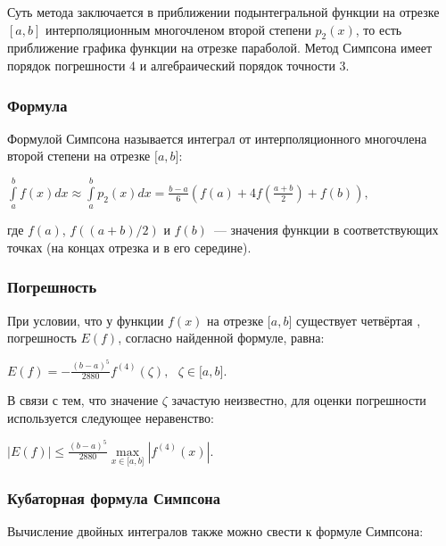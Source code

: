 \documentclass[a4paper]{article}
\begin{document}
{{{{{{{{Суть метода заключается в приближении подынтегральной функции на отрезке $[a,b]$ интерполяционным многочленом второй степени $p_2(x)$, то есть приближение графика функции на отрезке параболой. Метод Симпсона имеет порядок погрешности 4 и алгебраический порядок точности 3.

\subsubsection{Формула}

Формулой Симпсона называется интеграл от интерполяционного многочлена
второй степени на отрезке {{\(\lbrack a,b\rbrack\)}}:

\begin{center}
 {{\({\int\limits_{a}^{b}f(x)dx} \approx {\int\limits_{a}^{b}{p_{2}(x)}dx} = \frac{b - a}{6}\left( {f(a) + 4f\left( \frac{a + b}{2} \right) + f(b)} \right),\)}}
\end{center}

где {{\(f(a)\)}}, {{\(f((a + b)/2)\)}} и {{\(f(b)\)}}~--- значения
функции в соответствующих точках (на концах отрезка и в его середине).

\subsubsection{Погрешность}

При условии, что у функции {{\(f(x)\)}} на отрезке
{{\(\lbrack a,b\rbrack\)}} существует четвёртая , погрешность
{{\(E(f)\)}}, согласно найденной формуле, равна:

\begin{center}
 {{\(E(f) = - \frac{(b - a)^{5}}{2880}{f^{(4)}(\zeta)},\ \ \ \zeta \in \lbrack a,b\rbrack.\)}}
\end{center}

В связи с тем, что значение {{\(\zeta\)}} зачастую неизвестно, для
оценки погрешности используется следующее неравенство:

\begin{center}
 {{\(\left| {E(f)} \right| \leqslant \frac{(b - a)^{5}}{2880}\max\limits_{x \in \lbrack a,b\rbrack}\left| {f^{(4)}(x)} \right|.\)}}
\end{center}


\subsubsection{Кубаторная формула Симпсона}
Вычисление двойных интегралов также можно свести к формуле Симпсона:

}}}}}}}}
\end{document}
